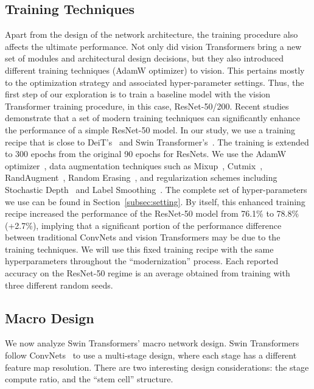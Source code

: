 \subsection{Training Techniques}
Apart from the design of the network architecture, the training procedure also affects the ultimate performance. 
Not only did vision Transformers bring a new set of modules and architectural design decisions, but they also introduced different training techniques (\eg AdamW optimizer) to vision.
This pertains mostly to the optimization strategy and associated hyper-parameter settings.
Thus, the first step of our exploration is to train a baseline model with the vision Transformer training procedure, in this case, ResNet-50/200. 
Recent studies~\cite{bello2021revisiting, Wightman2021resnet} demonstrate that a set of modern training techniques can significantly enhance the performance of a simple ResNet-50 model. In our study, we use a training recipe that is close to DeiT's~\cite{Touvron2020} and Swin Transformer's~\cite{Liu2021swin}. The training is extended to 300 epochs from the original 90 epochs for ResNets. We use the AdamW optimizer~\cite{Loshchilov2019}, data augmentation techniques such as Mixup~\cite{Zhang2018a}, Cutmix~\cite{Yun2019}, RandAugment~\cite{Cubuk2020}, Random Erasing~\cite{Zhong2020}, and regularization schemes including Stochastic Depth~\cite{Huang2016deep} and Label Smoothing~\cite{Szegedy2016a}. The complete set of hyper-parameters we use can be found in Section~\ref{subsec:setting}. By itself, this enhanced training recipe increased the performance of the ResNet-50 model from 76.1\% \cite{torchvision} to 78.8\% (+2.7\%), implying that a significant portion of the performance difference between traditional ConvNets and vision Transformers may be due to the training techniques. We will use this fixed training recipe with the same hyperparameters throughout the ``modernization'' process. Each reported accuracy on the ResNet-50 regime is an average obtained from training with three different random seeds.

\subsection{Macro Design}
We now analyze Swin Transformers' macro network design. Swin Transformers follow ConvNets~\cite{vgg, resnet} to use a multi-stage design, where each stage has a different feature map resolution. There are two interesting design considerations: the stage compute ratio, and the ``stem cell'' structure.
